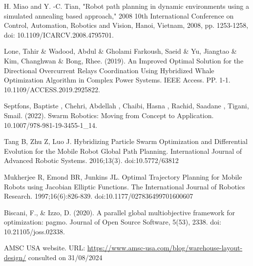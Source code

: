 \begin{thebibliography}{9}
H. Miao and Y. -C. Tian, "Robot path planning in dynamic environments using a simulated annealing based approach," 
2008 10th International Conference on Control, Automation, Robotics and Vision, Hanoi, Vietnam, 2008, pp. 1253-1258, 
doi: 10.1109/ICARCV.2008.4795701. 

Lone, Tahir \& Wadood, Abdul \& Gholami Farkoush, Saeid \& Yu, Jiangtao \& Kim, Changhwan \& Bong, Rhee. (2019). 
An Improved Optimal Solution for the Directional Overcurrent Relays Coordination Using Hybridized Whale Optimization Algorithm in Complex Power Systems. IEEE Access. PP. 1-1. 10.1109/ACCESS.2019.2925822. 

Septfons, Baptiste , Chehri, Abdellah , Chaibi, Hasna , Rachid, Saadane , Tigani, Smail. (2022). 
Swarm Robotics: Moving from Concept to Application. 10.1007/978-981-19-3455-1\_14.

Tang B, Zhu Z, Luo J. Hybridizing Particle Swarm Optimization and Differential Evolution for the Mobile Robot Global 
Path Planning. International Journal of Advanced Robotic Systems. 2016;13(3). doi:10.5772/63812

Mukherjee R, Emond BR, Junkins JL. Optimal Trajectory Planning for Mobile Robots using Jacobian Elliptic Functions. 
The International Journal of Robotics Research. 1997;16(6):826-839. doi:10.1177/027836499701600607

Biscani, F., \& Izzo, D. (2020). A parallel global multiobjective framework for optimization: pagmo. 
Journal of Open Source Software, 5(53), 2338. doi: 10.21105/joss.02338.

AMSC USA website. URL: \url{https://www.amsc-usa.com/blog/warehouse-layout-design/} consulted on 31/08/2024
\end{thebibliography}


